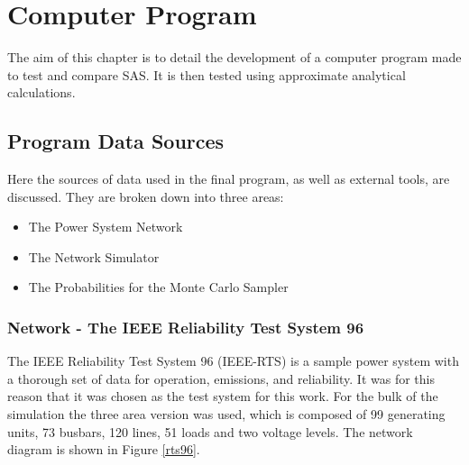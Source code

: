 \documentclass[a4paper,oneside,12pt]{report}
\newenvironment{vivacorrections}
{}
{}
\begin{document}









\chapter{Computer Program}

\begin{vivacorrections}
The aim of this chapter is to detail the development of a computer program made to test and compare SAS. It is then tested using approximate analytical calculations.
\end{vivacorrections}

\section{Program Data Sources}

Here the sources of data used in the final program, as well as external tools, are discussed. They are broken down into three areas:

\begin{itemize}
\item The Power System Network
\item The Network Simulator
\item The Probabilities for the Monte Carlo Sampler
\end{itemize}

\subsection{Network - The IEEE Reliability Test System 96\label{lbl_RTS}}

The IEEE Reliability Test System 96 (IEEE-RTS) \cite{Grigg1999} is a sample power system with a thorough set of data for operation, emissions, and reliability. It was for this reason that it was chosen as the test system for this work. For the bulk of the simulation the three area version was used, which is composed of 99 generating units, 73 busbars, 120 lines, 51 loads and two voltage levels. The network diagram is shown in Figure \ref{rts96}.
\end{document}
